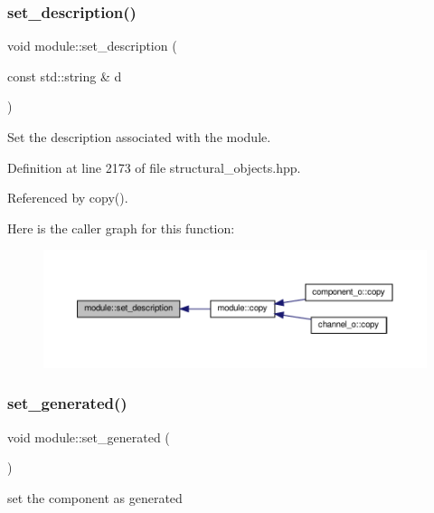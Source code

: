 \subsubsection{\texorpdfstring{set\+\_\+description()}{set\_description()}}
{\footnotesize\ttfamily void module\+::set\+\_\+description (\begin{DoxyParamCaption}\item[{const std\+::string \&}]{d }\end{DoxyParamCaption})\hspace{0.3cm}{\ttfamily [inline]}}



Set the description associated with the module. 



Definition at line 2173 of file structural\+\_\+objects.\+hpp.



Referenced by copy().

Here is the caller graph for this function\+:
\nopagebreak
\begin{figure}[H]
\begin{center}
\leavevmode
\includegraphics[width=350pt]{d0/dd3/classmodule_a29539019e1f525550504d9bd24bb319e_icgraph}
\end{center}
\end{figure}
\mbox{\label{classmodule_a270ec9a8ef484b315e81d013214ba328}} 
\subsubsection{\texorpdfstring{set\+\_\+generated()}{set\_generated()}}
{\footnotesize\ttfamily void module\+::set\+\_\+generated (\begin{DoxyParamCaption}{ }\end{DoxyParamCaption})}



set the component as generated 



